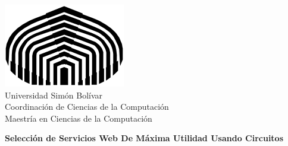 \begin{titlepage}

\begin{flushleft}
\includegraphics[scale=0.3]{logo_usb.png} \\
Universidad Simón Bolívar \\
Coordinación de Ciencias de la Computación \\
Maestría en Ciencias de la Computación \\
\end{flushleft}

\vspace{0.8cm}

\begin{center}
{\large \bf \textsf{Selección de Servicios Web De Máxima Utilidad Usando Circuitos}}
\end{center}

\vspace{0.2cm}


\end{titlepage}
